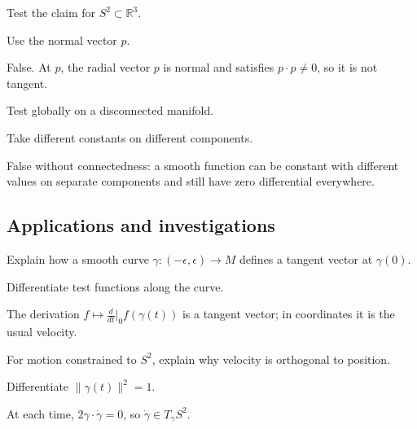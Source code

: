 \begin{exercise}\label{exr:vii04-ped-11}
Test the claim for \(S^2\subset\mathbb R^3\).
\end{exercise}
\begin{hint}
Use the normal vector \(p\).
\end{hint}
\begin{solution}
False.  At \(p\), the radial vector \(p\) is normal and satisfies \(p\cdot p\neq0\), so it is not tangent.
\end{solution}

\begin{exercise}\label{exr:vii04-ped-12}
Test globally on a disconnected manifold.
\end{exercise}
\begin{hint}
Take different constants on different components.
\end{hint}
\begin{solution}
False without connectedness: a smooth function can be constant with different values on separate components and still have zero differential everywhere.
\end{solution}

\subsection*{Applications and investigations}

\begin{exercise}\label{exr:vii04-ped-13}
Explain how a smooth curve \(\gamma:(-\epsilon,\epsilon)\to M\) defines a tangent vector at \(\gamma(0)\).
\end{exercise}
\begin{hint}
Differentiate test functions along the curve.
\end{hint}
\begin{solution}
The derivation \(f\mapsto \frac{d}{dt}|_0 f(\gamma(t))\) is a tangent vector; in coordinates it is the usual velocity.
\end{solution}

\begin{exercise}\label{exr:vii04-ped-14}
For motion constrained to \(S^2\), explain why velocity is orthogonal to position.
\end{exercise}
\begin{hint}
Differentiate \(\|\gamma(t)\|^2=1\).
\end{hint}
\begin{solution}
At each time, \(2\gamma\cdot\dot\gamma=0\), so \(\dot\gamma\in T_{\gamma}S^2\).
\end{solution}

